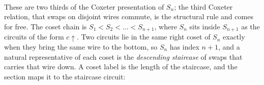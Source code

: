 \begin{minipage}[c]{0.68\textwidth}
\begingroup\renewcommand{\AgdaCodeStyle}{\footnotesize}
\begin{code}%
\>[0]\AgdaSpace{}%
\AgdaSpace{}%
\AgdaSymbol{:}\AgdaSpace{}%
\AgdaSymbol{(}\AgdaSpace{}%
\AgdaSymbol{:}\AgdaSpace{}%
\AgdaSymbol{)}\AgdaSpace{}%
\AgdaSpace{}%
\AgdaSpace{}%
\AgdaSymbol{(}\AgdaSpace{}%
\AgdaSymbol{)}\AgdaSpace{}%
\<%
\\
\>[0][@{}l@{\AgdaIndent{0}}]%
\>[2]%
\>[14]\AgdaSymbol{:}\AgdaSpace{}%
\AgdaSymbol{(}\AgdaSpace{}%
\AgdaSymbol{)}\AgdaSpace{}%
\AgdaSpace{}%
\AgdaSpace{}%
\AgdaSpace{}%
\AgdaSpace{}%
\AgdaOperator{\AgdaDatatype{===}}\AgdaSpace{}%
\<%
\\
%
\>[2]\AgdaSpace{}%
\AgdaSymbol{:}\AgdaSpace{}%
\AgdaSymbol{(}\AgdaSpace{}%
\AgdaSymbol{)}\AgdaSpace{}%
\AgdaSpace{}%
\AgdaSpace{}%
\AgdaSpace{}%
\AgdaSpace{}%
\AgdaSpace{}%
\AgdaSpace{}%
\AgdaSpace{}%
\AgdaOperator{\AgdaDatatype{===}}\AgdaSpace{}%
\AgdaSpace{}%
\AgdaSpace{}%
\AgdaSpace{}%
\AgdaSpace{}%
\AgdaSpace{}%
\AgdaSpace{}%
\<%
\end{code}
\endgroup
\end{minipage}\hfill
\begin{minipage}[c]{0.28\textwidth}\centering
  \\[3pt]
\end{minipage}

\medskip\noindent These are two thirds of the Coxeter presentation of
$S_n$; the third Coxeter relation, that swaps on disjoint wires commute,
is the structural rule  and comes for free.  The coset chain
is $S_1 < S_2 < \dots < S_{n+1}$, where $S_n$ sits inside $S_{n+1}$ as
the circuits of the form $c{\uparrow}$.  Two circuits lie in the same
right coset of $S_n$ exactly when they bring the same wire to the
bottom, so $S_n$ has index $n{+}1$, and a natural representative of each
coset is the \emph{descending staircase} of swaps that carries that
wire down.  A coset label is the length of the staircase, and the
section maps it to the staircase circuit:


